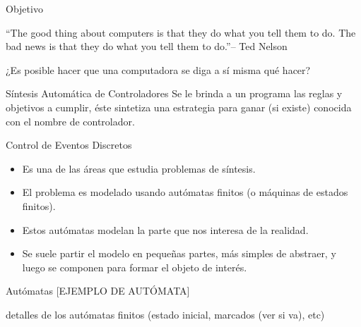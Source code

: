 \begin{frame}{Objetivo}
    \begin{block}{}
    ``The good thing about computers is that they do what you tell them to do. The bad news is that they do what you tell them to do.''\hfill – Ted Nelson 
    \end{block}
    
    \pause
    ¿Es posible hacer que una computadora se diga a sí misma qué hacer?
    
    \pause
    \begin{block}{Síntesis Automática de Controladores}
     Se le brinda a un programa las reglas y objetivos a cumplir, éste sintetiza una estrategia para ganar (si existe) conocida con el nombre de controlador.
    \end{block}

\end{frame}
\begin{frame}{Control de Eventos Discretos}
    \begin{itemize}
     \item Es una de las áreas que estudia problemas de síntesis.
     \item El problema es modelado usando autómatas finitos (o máquinas de estados finitos).
     \pause
     \item Estos autómatas modelan la parte que nos interesa de la realidad.
     \item Se suele partir el modelo en pequeñas partes, más simples de abstraer, y luego se componen para formar el objeto de interés.
    \end{itemize}
\end{frame}
\begin{frame}{Autómatas} 
    [EJEMPLO DE AUTÓMATA]

    detalles de los autómatas finitos (estado inicial, marcados (ver si va), etc)
\end{frame}
